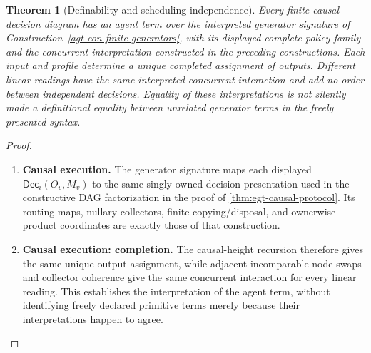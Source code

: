 \documentclass[11pt,a4paper]{article}
\numberwithin{equation}{section}
\newtheorem{theorem}{Theorem}[section]
\theoremstyle{definition}
\theoremstyle{remark}
\theoremstyle{plain}
\providecommand{\Dec}{\mathsf{Dec}}
\begin{document}
\begin{theorem}[Definability and scheduling independence]
\label{agt-thm-protocol}
Every finite causal decision diagram has an agent term over the interpreted
generator signature of Construction~\ref{agt-con-finite-generators}, with its
displayed complete policy family and the concurrent interpretation constructed
in the preceding constructions. Each input and profile determine a unique completed
assignment of outputs. Different linear readings have the same interpreted concurrent
interaction and add no order between independent decisions.  Equality of
these interpretations is not silently made a definitional equality between
unrelated generator terms in the freely presented syntax.
\end{theorem}

\begin{proof}
\leavevmode
\begin{enumerate}[label=\textup{(\arabic*)},leftmargin=*,itemsep=4pt,topsep=3pt]
  \item \textbf{Causal execution.} The generator signature maps each displayed $\Dec_i(O_v,M_v)$ to the
same singly owned decision presentation used in the constructive DAG
factorization in the proof of \cref{thm:egt-causal-protocol}. Its routing maps, nullary collectors, finite copying/disposal, and
ownerwise product coordinates are exactly those of that construction.
  \item \textbf{Causal execution: completion.} The causal-height recursion therefore gives the same unique output
assignment, while adjacent incomparable-node swaps and collector
coherence give the same concurrent interaction for every linear reading. This establishes the interpretation of the agent term, without identifying
freely declared primitive terms merely because their interpretations
happen to agree.
\end{enumerate}
\end{proof}
\end{document}
